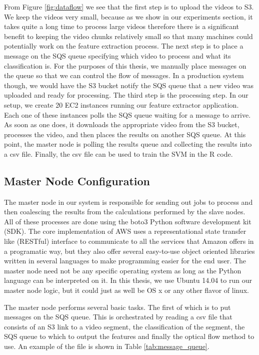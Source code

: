 From Figure \ref{fig:dataflow} we see that the first step is to upload
the videos to S3. We keep the videos very small, because as we show in our experiments
section, it takes quite a long time to process large videos therefore there is a
significant benefit to keeping the video chunks relatively small so that many
machines could potentially work on the feature extraction process. The next step
is to place a message on the SQS queue specifying which video to process and
what its classification is. For the purposes of this thesis, we manually place
messages on the queue so that we can control the flow of messages. In
a production system though, we would have the S3 bucket notify the SQS queue that
a new video was uploaded and ready for processing. The third step is the processing
step. In our setup, we create 20 EC2 instances running our feature extractor application.
Each one of these instances polls the SQS queue waiting for a message to arrive.
As soon as one does, it downloads the appropriate video from the S3 bucket,
processes the video, and then places the results on another SQS queue. At this
point, the master node is polling the results queue and collecting the results
into a csv file. Finally, the csv file can be used to train the SVM in the R
code.

\subsection{\label{subsection:master_node}Master Node Configuration}
The master node in our system is responsible for sending out jobs to process and
then coalescing the results from the calculations performed by the slave nodes.
All of these processes are done using the boto3 \cite{boto3} Python  software
development kit (SDK). The core implementation of AWS uses a  representational
state transfer like (RESTful) interface to communicate to all the services that
Amazon offers in a programatic  way, but they also offer several easy-to-use
object oriented libraries written  in several languages to make programming easier
for the end user. The master node
need not be any specific operating system as long as the Python language
can be interpreted on it. In this thesis, we use Ubuntu 14.04 to run our master
node logic, but it could just as well be OS x or any other flavor of linux.

The master node performs several basic tasks. The first of which is to put
messages on the SQS queue.  This is orchestrated by reading
a csv file that consists of an S3 link to a video segment, the classification of
the segment, the SQS queue to which to output the features and finally the
optical flow method to use. An example of the file is shown in Table
 \ref{tab:message_queue}.

